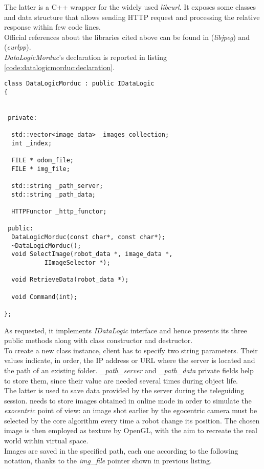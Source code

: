 The latter is a C++ wrapper for the widely used
\textit{libcurl}. It exposes some classes and data structure
that allows sending HTTP request and processing the relative
response within few code lines.
\\
Official references about the libraries cited above can be
found in \cite{library:libjpeg} (\textit{libjpeg}) and
\cite{library:curlpp} (\textit{curlpp}).
\\
\textit{DataLogicMorduc}'s declaration is reported in
listing \ref{code:datalogicmorduc:declaration}.
\\
\begin{lstlisting}[caption={\texttt{DataLogicLogMorduc} declaration},
    label={code:datalogicmorduc:declaration}]
class DataLogicMorduc : public IDataLogic
{
  

 private:

  std::vector<image_data> _images_collection;
  int _index;
  
  FILE * odom_file;
  FILE * img_file;

  std::string _path_server;
  std::string _path_data;

  HTTPFunctor _http_functor;
  
 public:
  DataLogicMorduc(const char*, const char*);
  ~DataLogicMorduc();
  void SelectImage(robot_data *, image_data *,
		   IImageSelector *);

  void RetrieveData(robot_data *);

  void Command(int);

};
\end{lstlisting}

As requested, it implements \textit{IDataLogic} interface and
hence presents its three public methods along with class constructor
and destructor.
\\
To create a new class instance, client has to specify
two string parameters. Their values indicate, in order, the IP
address or URL where the server is located and the path of an
existing folder. \textit{\_path\_server} and \textit{\_path\_data}
private fields help to store them, since their value are needed
several times during object life.
\\
The latter is used to save data provided by the server during the
teleguiding session. \framework{} needs to store images obtained
in online mode in order to simulate the \textit{exocentric} point
of view: an image shot earlier by the egocentric camera must be
selected by the core algorithm every time a robot change its position.
The chosen image is then employed as texture by OpenGL, with the aim
to recreate the real world within virtual space.
\\
Images are saved in the specified path, each one according to the
following notation, thanks to the \textit{img\_file} pointer
shown in previous listing.

